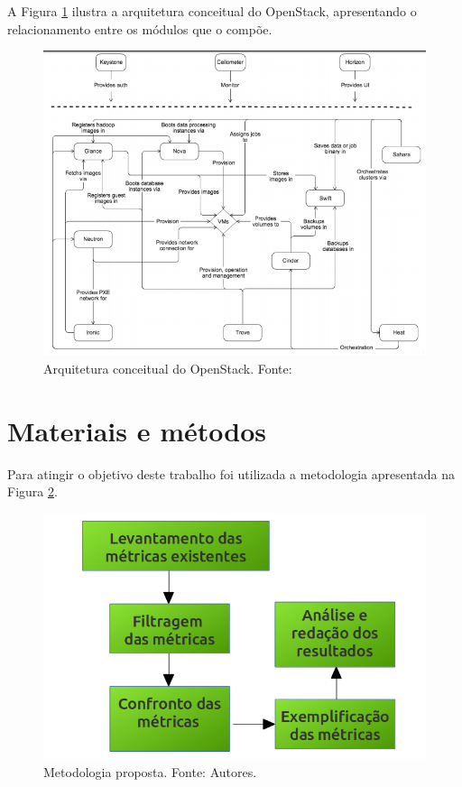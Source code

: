 \documentclass[conference]{IEEEtran}
\begin{document}
A Figura \ref{fig:openstack_architecture} ilustra a arquitetura conceitual do OpenStack, apresentando o relacionamento entre os
módulos que o compõe.

\begin{figure}[ht]
\centering
\includegraphics[width=.5\textwidth]{figuras/openstack_architecture.png}
\caption{Arquitetura conceitual do OpenStack. Fonte: \cite{openstack}}
\label{fig:openstack_architecture}
\end{figure}

\section{Materiais e métodos}

Para atingir o objetivo deste trabalho foi utilizada a metodologia apresentada na Figura \ref{metodologia}.

\begin{figure}[ht]
  \centering
  \includegraphics[width=.3\textwidth]{figuras/metodologia.png}
  \caption{Metodologia proposta. Fonte: Autores.}
  \label{metodologia}
\end{figure}
\end{document}
